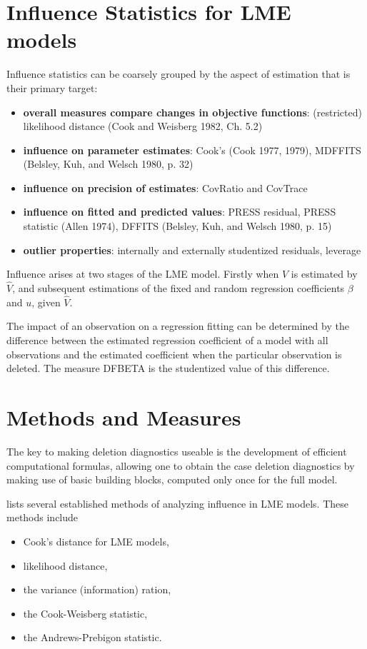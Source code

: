 \documentclass[12pt, a4paper]{report}
\theoremstyle{plain}
\theoremstyle{definition}
\theoremstyle{remark}
\begin{document}
\section{Influence Statistics for LME models} %
Influence statistics can be coarsely grouped by the aspect of estimation that is their primary target:
\begin{itemize}
	\item \textbf{overall measures compare changes in objective functions}: (restricted) likelihood distance (Cook and Weisberg 1982, Ch. 5.2)
	\item \textbf{influence on parameter estimates}: Cook's  (Cook 1977, 1979), MDFFITS (Belsley, Kuh, and Welsch 1980, p. 32)
	\item \textbf{influence on precision of estimates}: CovRatio and CovTrace
	\item \textbf{influence on fitted and predicted values}: PRESS residual, PRESS statistic (Allen 1974), DFFITS (Belsley, Kuh, and Welsch 1980, p. 15)
	\item \textbf{outlier properties}: internally and externally studentized residuals, leverage
\end{itemize}

Influence arises at two stages of the LME model. Firstly when $V$ is estimated by $\hat{V}$, and subsequent
estimations of the fixed and random regression coefficients $\beta$ and $u$, given $\hat{V}$.

The impact of an observation on a regression fitting can be determined by the difference between the estimated regression coefficient of a model with all observations and the estimated coefficient when the particular observation is deleted. The measure DFBETA is the studentized value of this difference.

\section{Methods and Measures}
The key to making deletion diagnostics useable is the development of efficient computational formulas, allowing one to obtain the  case deletion diagnostics by making use of basic building blocks, computed only once for the full model.


\citet{Zewotir} lists several established methods of analyzing influence in LME models. These methods include \begin{itemize}
	\item Cook's distance for LME models,
	\item {} likelihood distance,
	\item the variance (information) ration,
	\item the  Cook-Weisberg statistic,
	\item the  Andrews-Prebigon statistic.
\end{itemize}
\end{document}
